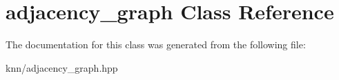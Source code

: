 \hypertarget{classadjacency__graph}{}\section{adjacency\+\_\+graph Class Reference}
\label{classadjacency__graph}


The documentation for this class was generated from the following file\+:\begin{DoxyCompactItemize}
\item 
knn/adjacency\+\_\+graph.\+hpp\end{DoxyCompactItemize}
